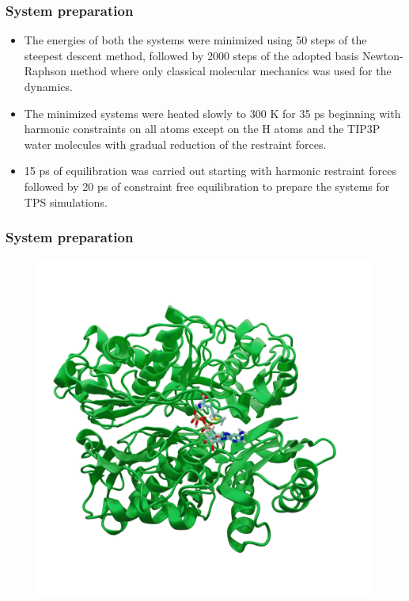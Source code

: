 \documentclass{beamer}
\begin{document}
\begin{frame}
\frametitle{System preparation}
\begin{itemize}
\item The energies of both the systems were minimized using 50 steps of the 
steepest descent method, followed by 2000 steps of the
adopted basis Newton-Raphson method where only classical molecular mechanics 
was used for the dynamics. 

\item The minimized systems were
heated slowly to 300 K for 35 ps beginning with harmonic
constraints on all atoms except on the H atoms and the TIP3P 
water molecules with gradual reduction of the restraint forces. 

\item 15 ps of equilibration was carried out starting with harmonic 
restraint forces followed by 20 ps of constraint free 
equilibration to prepare the systems for TPS simulations. 

\end{itemize}
\end{frame}
\begin{frame}
\frametitle{System preparation}
\begin{figure}
\centering 
\includegraphics[scale=0.2]{figures/mat2a-equil.png}
\end{figure}
\end{frame}
\end{document}
